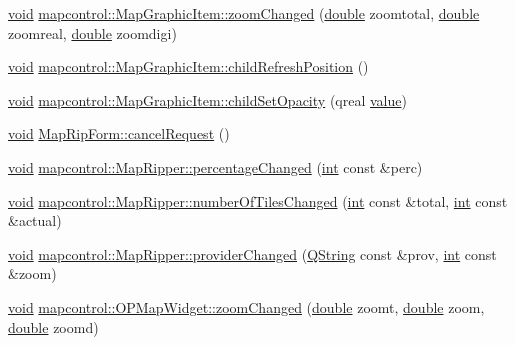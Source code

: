 \begin{DoxyCompactItemize}
\hyperlink{group___u_a_v_objects_plugin_ga444cf2ff3f0ecbe028adce838d373f5c}{void} \hyperlink{group___o_p_map_widget_ga7022afbf8533ece279e5b06dcbe66935}{mapcontrol\-::\-Map\-Graphic\-Item\-::zoom\-Changed} (\hyperlink{_super_l_u_support_8h_a8956b2b9f49bf918deed98379d159ca7}{double} zoomtotal, \hyperlink{_super_l_u_support_8h_a8956b2b9f49bf918deed98379d159ca7}{double} zoomreal, \hyperlink{_super_l_u_support_8h_a8956b2b9f49bf918deed98379d159ca7}{double} zoomdigi)
\item 
\hyperlink{group___u_a_v_objects_plugin_ga444cf2ff3f0ecbe028adce838d373f5c}{void} \hyperlink{group___o_p_map_widget_ga4877137ff20f1713d86737fcde3e5eef}{mapcontrol\-::\-Map\-Graphic\-Item\-::child\-Refresh\-Position} ()
\item 
\hyperlink{group___u_a_v_objects_plugin_ga444cf2ff3f0ecbe028adce838d373f5c}{void} \hyperlink{group___o_p_map_widget_ga2e3c45d4bbf9d439e3e6bb83d138c340}{mapcontrol\-::\-Map\-Graphic\-Item\-::child\-Set\-Opacity} (qreal \hyperlink{glext_8h_aa0e2e9cea7f208d28acda0480144beb0}{value})
\item 
\hyperlink{group___u_a_v_objects_plugin_ga444cf2ff3f0ecbe028adce838d373f5c}{void} \hyperlink{group___o_p_map_widget_gada316d63680a0cc029958b0d0eb33f4a}{Map\-Rip\-Form\-::cancel\-Request} ()
\item 
\hyperlink{group___u_a_v_objects_plugin_ga444cf2ff3f0ecbe028adce838d373f5c}{void} \hyperlink{group___o_p_map_widget_ga49c16d8dabea46c8afafb51521e2428b}{mapcontrol\-::\-Map\-Ripper\-::percentage\-Changed} (\hyperlink{ioapi_8h_a787fa3cf048117ba7123753c1e74fcd6}{int} const \&perc)
\item 
\hyperlink{group___u_a_v_objects_plugin_ga444cf2ff3f0ecbe028adce838d373f5c}{void} \hyperlink{group___o_p_map_widget_ga5e1cd3587aa324cbf448b05771ef51c8}{mapcontrol\-::\-Map\-Ripper\-::number\-Of\-Tiles\-Changed} (\hyperlink{ioapi_8h_a787fa3cf048117ba7123753c1e74fcd6}{int} const \&total, \hyperlink{ioapi_8h_a787fa3cf048117ba7123753c1e74fcd6}{int} const \&actual)
\item 
\hyperlink{group___u_a_v_objects_plugin_ga444cf2ff3f0ecbe028adce838d373f5c}{void} \hyperlink{group___o_p_map_widget_ga19cc407500250e1c43e975e30ea90112}{mapcontrol\-::\-Map\-Ripper\-::provider\-Changed} (\hyperlink{group___u_a_v_objects_plugin_gab9d252f49c333c94a72f97ce3105a32d}{Q\-String} const \&prov, \hyperlink{ioapi_8h_a787fa3cf048117ba7123753c1e74fcd6}{int} const \&zoom)
\item 
\hyperlink{group___u_a_v_objects_plugin_ga444cf2ff3f0ecbe028adce838d373f5c}{void} \hyperlink{group___o_p_map_widget_ga5f82149d3970603013155e5ace73c085}{mapcontrol\-::\-O\-P\-Map\-Widget\-::zoom\-Changed} (\hyperlink{_super_l_u_support_8h_a8956b2b9f49bf918deed98379d159ca7}{double} zoomt, \hyperlink{_super_l_u_support_8h_a8956b2b9f49bf918deed98379d159ca7}{double} zoom, \hyperlink{_super_l_u_support_8h_a8956b2b9f49bf918deed98379d159ca7}{double} zoomd)

\end{DoxyCompactItemize}
